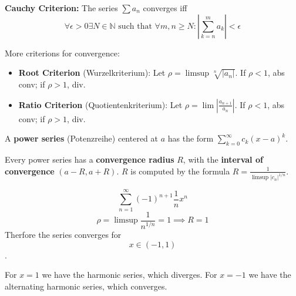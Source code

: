 \begin{theorem}
\textbf{Cauchy Criterion:} The series $\sum a_n$ converges iff $$\forall \epsilon \gt 0 \exists N \in \mathbb{N} \text{ such that } \forall m, n \ge N : |\sum_{k=n}^m a_k| \lt \epsilon$$
\end{theorem}

\begin{theorem}
More criterions for convergence:
\begin{itemize}
    \item \textbf{Root Criterion} (Wurzelkriterium): Let $\rho = \limsup \sqrt[n]{|a_n|}$. If $\rho \lt 1$, abs conv; if $\rho \gt 1$, div.
    \item \textbf{Ratio Criterion} (Quotientenkriterium): Let $\rho = \lim \left| \frac{a_{n+1}}{a_n} \right|$. If $\rho \lt 1$, abs conv; if $\rho \gt 1$, div.
\end{itemize}
\end{theorem}

\begin{definition}
A \textbf{power series} (Potenzreihe) centered at $a$ has the form $\sum_{k=0}^\infty c_k(x-a)^k$.
\end{definition}

\begin{theorem}
Every power series has a \textbf{convergence radius} $R$, with the \textbf{interval of convergence} $(a-R, a+R)$.
$R$ is computed by the formula $R = \frac{1}{\limsup |c_n|^{1/n}}$.
\end{theorem}

\begin{example}
$$\sum_{n=1}^\infty (-1)^{n+1} \frac{1}{n}x^n$$
$$\rho = \limsup \frac{1}{n^{1/n}} = 1 \implies R = 1$$
Therfore the series converges for $$x \in (-1, 1)$$.
\end{example}

\begin{remark}
For $x = 1$ we have the harmonic series, which diverges.
For $x = -1$ we have the alternating harmonic series, which converges.
\end{remark}
